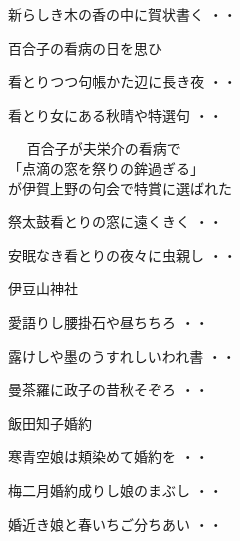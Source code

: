 \vspace{ 0.4cm}
\begin{shiika}新らしき木の香の中に賀状書く
\hfill{・・}\end{shiika}
\vspace{ 0.4cm}
百合子の看病の日を思ひ
\begin{shiika}看とりつつ句帳かた辺に長き夜
\hfill{・・}\end{shiika}
\begin{shiika}看とり女にある秋晴や特選句
\hfill{・・}\end{shiika}
\qquad\qquad\qquad{}　
 百合子が夫栄介の看病で\\
\qquad\qquad\qquad「点滴の窓を祭りの鉾過ぎる」\\
\qquad\qquad\qquad が伊賀上野の句会で特賞に選ばれた\\
\begin{shiika}祭太鼓看とりの窓に遠くきく
\hfill{・・}\end{shiika}
\begin{shiika}安眠なき看とりの夜々に虫親し
\hfill{・・}\end{shiika}
\vspace{ 0.4cm}
伊豆山神社
\begin{shiika}愛語りし腰掛石や昼ちちろ
\hfill{・・}\end{shiika}
\begin{shiika}露けしや墨のうすれしいわれ書
\hfill{・・}\end{shiika}
\begin{shiika}曼茶羅に政子の昔秋そぞろ
\hfill{・・}\end{shiika}
\vspace{ 0.4cm}
飯田知子婚約
\begin{shiika}寒青空娘は頬染めて婚約を
\hfill{・・}\end{shiika}
\begin{shiika}梅二月婚約成りし娘のまぶし
\hfill{・・}\end{shiika}
\begin{shiika}婚近き娘と春いちご分ちあい
\hfill{・・}\end{shiika}
\vspace{ 0.4cm}
